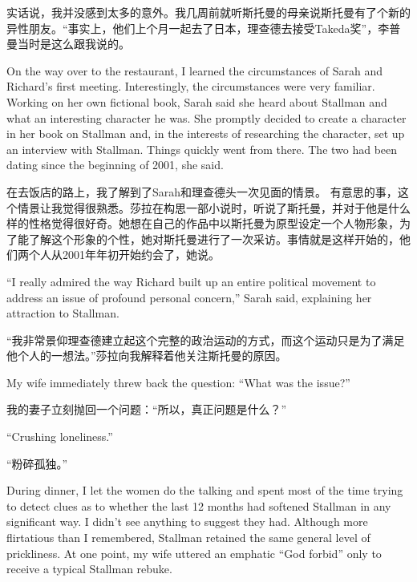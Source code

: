 \ifdefined\chs
实话说，我并没感到太多的意外。我几周前就听斯托曼的母亲说斯托曼有了个新的异性朋友。“事实上，他们上个月一起去了日本，理查德去接受Takeda奖”，李普曼当时是这么跟我说的。
\fi

\ifdefined\eng
On the way over to the restaurant, I learned the circumstances of Sarah and Richard's first meeting. Interestingly, the circumstances were very familiar. Working on her own fictional book, Sarah said she heard about Stallman and what an interesting character he was. She promptly decided to create a character in her book on Stallman and, in the interests of researching the character, set up an interview with Stallman. Things quickly went from there. The two had been dating since the beginning of 2001, she said.
\fi

\ifdefined\chs
在去饭店的路上，我了解到了Sarah和理查德头一次见面的情景。 有意思的事，这个情景让我觉得很熟悉。莎拉在构思一部小说时，听说了斯托曼，并对于他是什么样的性格觉得很好奇。她想在自己的作品中以斯托曼为原型设定一个人物形象，为了能了解这个形象的个性，她对斯托曼进行了一次采访。事情就是这样开始的，他们两个人从2001年年初开始约会了，她说。
\fi

\ifdefined\eng
``I really admired the way Richard built up an entire political movement to address an issue of profound personal concern,'' Sarah said, explaining her attraction to Stallman.
\fi

\ifdefined\chs
“我非常景仰理查德建立起这个完整的政治运动的方式，而这个运动只是为了满足他个人的一想法。”莎拉向我解释着他关注斯托曼的原因。
\fi

\ifdefined\eng
My wife immediately threw back the question: ``What was the issue?''
\fi

\ifdefined\chs
我的妻子立刻抛回一个问题：“所以，真正问题是什么？”
\fi

\ifdefined\eng
``Crushing loneliness.''
\fi

\ifdefined\chs
“粉碎孤独。”
\fi

\ifdefined\eng
During dinner, I let the women do the talking and spent most of the time trying to detect clues as to whether the last 12 months had softened Stallman in any significant way. I didn't see anything to suggest they had. Although more flirtatious than I remembered, Stallman retained the same general level of prickliness. At one point, my wife uttered an emphatic ``God forbid'' only to receive a typical Stallman rebuke.
\fi

